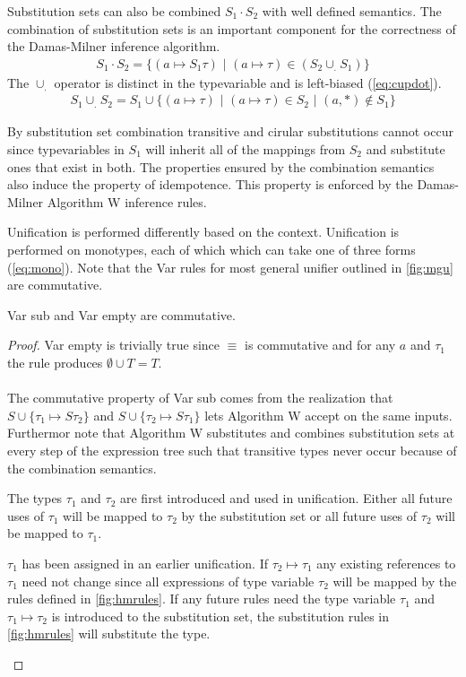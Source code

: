 \documentclass[11pt,oneside,a4paper]{report}
\begin{document}
Substitution sets can also be combined $S_1 \cdot S_2$ with well defined semantics.
The combination of substitution sets is an important component for the correctness of the Damas-Milner inference algorithm.
\begin{align}
    S_1 \cdot S_2 = \{ (a \mapsto S_1\tau) \,\,|\,\, (a \mapsto \tau) \in (S_2 \cup_. S_1) \}
    \label{eq:combination}
\end{align}
The $\cup_.$ operator is distinct in the typevariable and is left-biased (\autoref{eq:cupdot}).
\begin{align}
    S_1 \cup_. S_2 = S_1 \cup \{ (a \mapsto \tau) \,\,|\,\, (a \mapsto \tau) \in S_2 \,\,|\,\, (a, *) \notin S_1 \}
    \label{eq:cupdot}
\end{align}
\begin{remark}
By substitution set combination transitive and cirular substitutions cannot occur since typevariables in $S_1$ will inherit all of the mappings from $S_2$ and substitute ones that exist in both.
The properties ensured by the combination semantics also induce the property of idempotence.
This property is enforced by the Damas-Milner Algorithm W inference rules.
\end{remark}
Unification is performed differently based on the context.
Unification is performed on monotypes, each of which which can take one of three forms (\autoref{eq:mono}).
Note that the Var rules for most general unifier outlined in \autoref{fig:mgu} are commutative.
\begin{lemma}
	Var sub and Var empty are commutative.
\end{lemma}
\begin{proof}
	Var empty is trivially true since $\equiv$ is commutative and for any $a$ and $\tau_1$ the rule produces $\emptyset \cup T = T$.\\\\
    The commutative property of Var sub comes from the realization that $S \cup \{ \tau_1 \mapsto S\tau_2 \}$ and $S \cup \{ \tau_2 \mapsto S\tau_1 \}$ lets Algorithm W accept on the same inputs.
    Furthermor note that Algorithm W substitutes and combines substitution sets at every step of the expression tree such that transitive types never occur because of the combination semantics.
    \begin{case}
        The types $\tau_1$ and $\tau_2$ are first introduced and used in unification.
        Either all future uses of $\tau_1$ will be mapped to $\tau_2$ by the substitution set or all future uses of $\tau_2$ will be mapped to $\tau_1$.
    \end{case}
    \begin{case}
        $\tau_1$ has been assigned in an earlier unification.
        If $\tau_2 \mapsto \tau_1$ any existing references to $\tau_1$ need not change since all expressions of type variable $\tau_2$ will be mapped by the rules defined in \autoref{fig:hmrules}.
        If any future rules need the type variable $\tau_1$ and $\tau_1 \mapsto \tau_2$ is introduced to the substitution set, the substitution rules in \autoref{fig:hmrules} will substitute the type.
    \end{case}
\end{proof}
\end{document}
